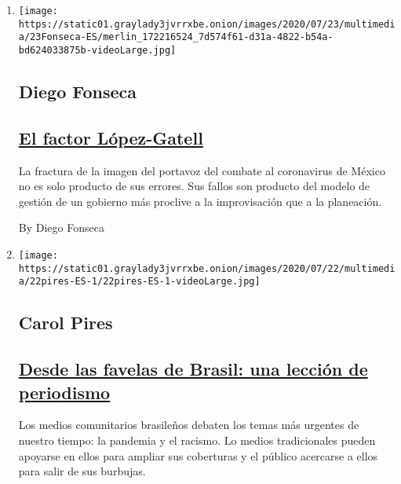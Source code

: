 \begin{enumerate}
\def\labelenumi{\arabic{enumi}.}
\item
  \texttt{[image: https://static01.graylady3jvrrxbe.onion/images/2020/07/23/multimedia/23Fonseca-ES/merlin\_172216524\_7d574f61-d31a-4822-b54a-bd624033875b-videoLarge.jpg]}

  \hypertarget{diego-fonseca}{%
  \subsection{Diego Fonseca}\label{diego-fonseca}}

  \hypertarget{el-factor-luxf3pez-gatell}{%
  \subsection{\texorpdfstring{\href{/es/2020/07/23/espanol/opinion/lopez-gatell.html}{El
  factor
  López-Gatell}}{El factor López-Gatell}}\label{el-factor-luxf3pez-gatell}}

  La fractura de la imagen del portavoz del combate al coronavirus de
  México no es solo producto de sus errores. Sus fallos son producto del
  modelo de gestión de un gobierno más proclive a la improvisación que a
  la planeación.

  By Diego Fonseca
\item
  \texttt{[image: https://static01.graylady3jvrrxbe.onion/images/2020/07/22/multimedia/22pires-ES-1/22pires-ES-1-videoLarge.jpg]}

  \hypertarget{carol-pires}{%
  \subsection{Carol Pires}\label{carol-pires}}

  \hypertarget{desde-las-favelas-de-brasil-una-lecciuxf3n-de-periodismo}{%
  \subsection{\texorpdfstring{\href{/es/2020/07/22/espanol/opinion/periodismo-brasil-favelas.html}{Desde
  las favelas de Brasil: una lección de
  periodismo}}{Desde las favelas de Brasil: una lección de periodismo}}\label{desde-las-favelas-de-brasil-una-lecciuxf3n-de-periodismo}}

  Los medios comunitarios brasileños debaten los temas más urgentes de
  nuestro tiempo: la pandemia y el racismo. Lo medios tradicionales
  pueden apoyarse en ellos para ampliar sus coberturas y el público
  acercarse a ellos para salir de sus burbujas.


\end{enumerate}
